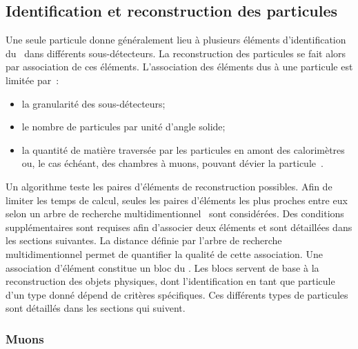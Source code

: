 \subsection{Identification et reconstruction des particules}\label{chapter-LHC-section-evt_reco-subsec-ptc_ID}
Une seule particule donne généralement lieu à plusieurs éléments d'identification du \PF\ dans différents sous-détecteurs.
La reconstruction des particules se fait alors par association de ces éléments.
L'association des éléments dus à une particule est limitée par~\cite{particle-flow}:
\begin{itemize}
\item la granularité des sous-détecteurs;
\item le nombre de particules par unité d'angle solide;
\item la quantité de matière traversée par les particules en amont des calorimètres ou, le cas échéant, des chambres à muons, pouvant dévier la particule~\cite{moliere_scat_1,moliere_scat_2}.
\end{itemize}
\par Un algorithme teste les paires d'éléments de reconstruction possibles.
Afin de limiter les temps de calcul, seules les paires d'éléments les plus proches entre eux selon un arbre de recherche multidimentionnel~\cite{bentley} sont considérées.
Des conditions supplémentaires sont requises afin d'associer deux éléments et sont détaillées dans les sections suivantes.
La distance définie par l'arbre de recherche multidimentionnel permet de quantifier la qualité de cette association.
Une association d'élément constitue un \og bloc \fg{} du \PF.
Les blocs servent de base à la reconstruction des objets physiques, dont l'identification en tant que particule d'un type donné dépend de critères spécifiques.
Ces différents types de particules sont détaillés dans les sections qui suivent.
\subsubsection{Muons}
